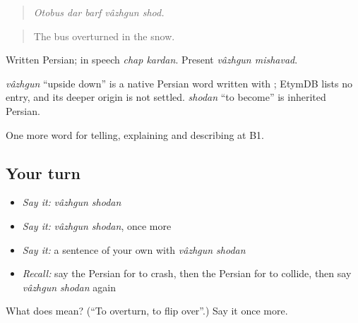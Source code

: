\begin{quote}
\emph{Otobus dar barf vâzhgun shod.}
\end{quote}

\begin{quote}
The bus overturned in the snow.
\end{quote}

Written Persian; in speech \emph{chap kardan}. Present \emph{vâzhgun mishavad}.

\begin{cousinweb}
\emph{vâzhgun} \textquotedblleft{}upside down\textquotedblright{} is a native Persian word written with ; EtymDB lists no entry, and its deeper origin is not settled. \emph{shodan} \textquotedblleft{}to become\textquotedblright{} is inherited Persian.
\end{cousinweb}

\begin{grammarlens}[title={What you've built}]
One more word for telling, explaining and describing at B1.
\end{grammarlens}

\subsection*{Your turn}
\begin{itemize}
\raggedright
  \item \emph{Say it:} \emph{vâzhgun shodan}
  \item \emph{Say it:} \emph{vâzhgun shodan}, once more
  \item \emph{Say it:} a sentence of your own with \emph{vâzhgun shodan}
  \item \emph{Recall:} say the Persian for to crash, then the Persian for to collide, then say \emph{vâzhgun shodan} again
\end{itemize}

\begin{tcolorbox}[breakable,colback=teal!4,colframe=teal!35!black,title={Before you move on}]
What does   mean? (\textquotedblleft{}To overturn, to flip over\textquotedblright{}.) Say it once more.
\end{tcolorbox}
